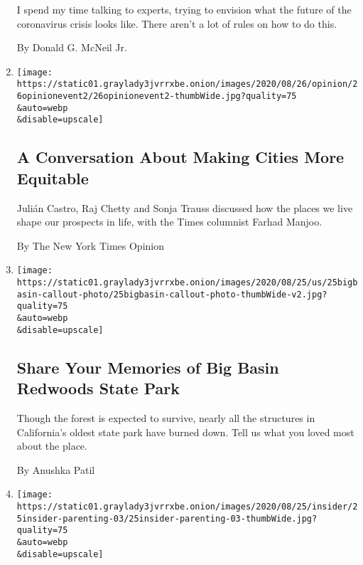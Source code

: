 \begin{enumerate}
  I spend my time talking to experts, trying to envision what the future
  of the coronavirus crisis looks like. There aren't a lot of rules on
  how to do this.

  By Donald G. McNeil Jr.
\item
  \href{/2020/08/26/opinion/event-fair-housing-segregation.html}{}

  \texttt{[image: https://static01.graylady3jvrrxbe.onion/images/2020/08/26/opinion/26opinionevent2/26opinionevent2-thumbWide.jpg?quality=75\\\&auto=webp\\\&disable=upscale]}

  \hypertarget{a-conversation-about-making-cities-more-equitable}{%
  \subsection{A Conversation About Making Cities More
  Equitable}\label{a-conversation-about-making-cities-more-equitable}}

  Julián Castro, Raj Chetty and Sonja Trauss discussed how the places we
  live shape our prospects in life, with the Times columnist Farhad
  Manjoo.

  By The New York Times Opinion
\item
  \href{/2020/08/25/reader-center/share-memories-of-big-basin.html}{}

  \texttt{[image: https://static01.graylady3jvrrxbe.onion/images/2020/08/25/us/25bigbasin-callout-photo/25bigbasin-callout-photo-thumbWide-v2.jpg?quality=75\\\&auto=webp\\\&disable=upscale]}

  \hypertarget{share-your-memories-of-big-basin-redwoods-state-park}{%
  \subsection{Share Your Memories of Big Basin Redwoods State
  Park}\label{share-your-memories-of-big-basin-redwoods-state-park}}

  Though the forest is expected to survive, nearly all the structures in
  California's oldest state park have burned down. Tell us what you
  loved most about the place.

  By Anushka Patil
\item
  \href{/2020/08/25/insider/parenting-desk.html}{}

  \texttt{[image: https://static01.graylady3jvrrxbe.onion/images/2020/08/25/insider/25insider-parenting-03/25insider-parenting-03-thumbWide.jpg?quality=75\\\&auto=webp\\\&disable=upscale]}

  \hypertarget{times-insider-6}{%
}
\end{enumerate}
